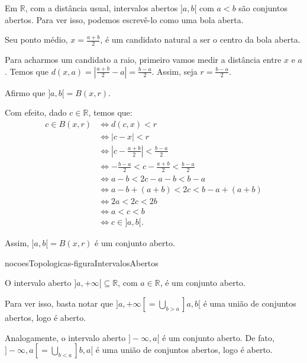 \begin{example}\label{exemplo:intervalos-abertos-sao-abertos}
    Em $\mathbb R$, com a distância usual, intervalos abertos $]a, b[$ com $a<b$ são conjuntos abertos.
    Para ver isso, podemos escrevê-lo como uma bola aberta.
    
    Seu ponto médio, $x=\frac{a+b}{2}$, é um candidato natural a ser o centro da bola aberta.

    Para acharmos um candidato a raio, primeiro vamos medir a distância entre $x$ e $a$.
    Temos que $d(x, a) = \left|\frac{a+b}{2} - a\right| = \frac{b-a}{2}$.
    Assim, seja $r = \frac{b-a}{2}$.

    Afirmo que $]a, b[=B(x, r)$.

    Com efeito, dado $c \in \mathbb R$, temos que:
    \begin{align*}
        c \in B(x, r) &\Leftrightarrow d(c, x) < r \\
        &\Leftrightarrow |c-x| < r \\
        &\Leftrightarrow |c-\frac{a+b}{2}| < \frac{b-a}{2} \\
        &\Leftrightarrow -\frac{b-a}{2} < c-\frac{a+b}{2} < \frac{b-a}{2} \\
        &\Leftrightarrow a-b< 2c - a - b < b-a \\
        &\Leftrightarrow a-b+(a+b) < 2c < b-a+(a+b) \\
        &\Leftrightarrow 2a< 2c < 2b \\
        &\Leftrightarrow a < c < b \\
        &\Leftrightarrow c \in ]a, b[.
    \end{align*}

    Assim, $]a, b[=B(x, r)$ é um conjunto aberto.
\end{example}

{nocoesTopologicas-figuraIntervalosAbertos}

\begin{example}
    O intervalo aberto $]a, +\infty[\subseteq \mathbb R$, com $a \in \mathbb R$, é um conjunto aberto.
    
    Para ver isso, basta notar que $]a, +\infty[ = \bigcup_{b>a} ]a, b[$ é uma união de conjuntos abertos, logo é aberto.

    Analogamente, o intervalo aberto $]-\infty, a[$ é um conjunto aberto.
    De fato, $]-\infty, a[ = \bigcup_{b<a} ]b, a[$ é uma união de conjuntos abertos, logo é aberto.
\end{example}

